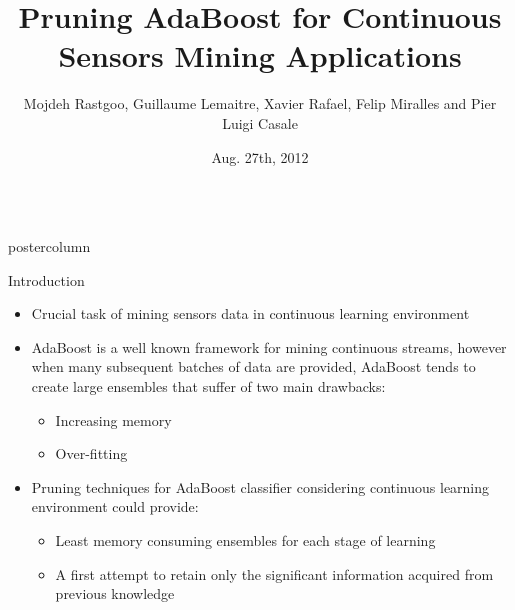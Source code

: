 \documentclass[final]{beamer}
\title{\huge Pruning AdaBoost for Continuous Sensors Mining Applications}
\author{Mojdeh Rastgoo, Guillaume Lemaitre, Xavier Rafael, Felip Miralles and Pier Luigi Casale}
\institute[BDigital Technology Centre]{eHealth R\&D, BDigital Technology Centre, Barcelona, Spain}
\date[Aug. 27th, 2012]{Aug. 27th, 2012}
\newlength{\columnheight}
\begin{document}
\begin{frame}
  \begin{columns}
    \begin{column}{.49\textwidth}
      \begin{beamercolorbox}[center,wd=\textwidth]{postercolumn}
        \begin{minipage}[T]{.95\textwidth}  %
          \parbox[t][\columnheight]{\textwidth}{ %
            \begin{block}{Introduction}
              \begin{itemize}
               \item Crucial task of mining sensors data in continuous learning environment               
               \item AdaBoost is a well known framework for mining continuous streams, however when many subsequent batches of data are provided, AdaBoost tends to create large ensembles that suffer of two main drawbacks: 
               \begin{itemize}               
               \item Increasing memory 
               \item Over-fitting 
               \end{itemize}
               \item Pruning techniques for AdaBoost classifier considering continuous learning environment could provide: 
                \begin{itemize}
                \item Least memory consuming ensembles for each stage of learning  
                \item A first attempt to retain only the significant information acquired from previous knowledge
                \end{itemize}
                \end{itemize}

\end{block}}
\end{minipage}
\end{beamercolorbox}
\end{column}
\end{columns}
\end{frame}
\end{document}

